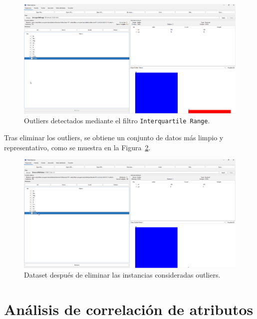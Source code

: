 \documentclass{article}
\begin{document}
\begin{itemize}
    \begin{figure}[!ht]
        \centering
        \includegraphics[width=1\linewidth]{Imágenes/outliers.png}
        \caption{Outliers detectados mediante el filtro \texttt{Interquartile Range}.}
        \label{fig:outliers}
    \end{figure}
    
    Tras eliminar los outliers, se obtiene un conjunto de datos más limpio y representativo, como se muestra en la Figura~\ref{fig:no-outliers}.
    
    \begin{figure}[!ht]
        \centering
        \includegraphics[width=1\linewidth]{Imágenes/sin-outliers.png}
        \caption{Dataset después de eliminar las instancias consideradas outliers.}
        \label{fig:no-outliers}
    \end{figure}

\end{itemize}


\section{Análisis de correlación de atributos}
\end{document}
